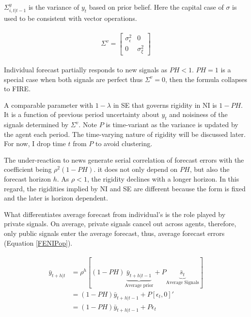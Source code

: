 \documentclass[12pt]{article}
\begin{document}
	$\Sigma^y_{i,t|t-1}$  is the variance of  $y_t$ based on prior belief. Here the capital case of $\sigma$ is used to be consistent with vector operations. 
	
	\begin{eqnarray}
		\begin{aligned}
			\Sigma^v =  \left[ \begin{matrix} 
				\sigma^2_{\epsilon} &  0 \\ 
				0 & \sigma^2_\xi \end{matrix}\right] 
		\end{aligned}
	\end{eqnarray}
	
	Individual forecast partially responds to new signals as  $PH<1$. $PH=1$ is a special case when both signals are perfect thus $\Sigma^v = 0$, then the formula collapses to FIRE. 
	
	
	A comparable parameter with $1-\lambda$ in SE that governs rigidity in NI is $1-PH$. It is a function of previous period uncertainty about $y_t$ and noisiness of the signals determined by $\Sigma^v$. Note $P$ is time-variant as the variance is updated by the agent each period. The time-varying nature of rigidity will be discussed later. For now, I drop time $t$ from $P$ to avoid clustering.  
	
	The under-reaction to news generate serial correlation of forecast errors with the coefficient being $\rho^2(1-PH)$. it does not only depend on $PH$, but also the forecast horizon $h$. As $\rho<1$, the rigidity declines with a longer horizon. In this regard, the rigidities implied by NI and SE are different because the form is fixed and the later is horizon dependent. 
	
	What differentiates average forecast from individual's is the role played by private signals. On average, private signals cancel out across agents, therefore, only public signals enter the average forecast, thus, average forecast errors (Equation \ref{FENIPop}). 
	
	\begin{eqnarray}\label{FENIPop}
		\begin{aligned}
			\bar y_{t+h|t} & = \rho^h [(1-PH) \underbrace{\bar  y_{t+h|t-1}}_{\text{Average prior}} + P \underbrace{\bar s_{t}}_{\text{Average Signals}}] \\
			& = (1-PH) \bar y_{t+h|t-1}+ P [\epsilon_t, 0]' \\
			& = (1-PH) \bar y_{t+h|t-1} + P \epsilon_t
		\end{aligned}
	\end{eqnarray}
	
\end{document}
